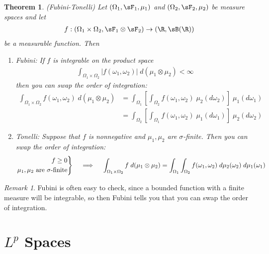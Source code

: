 \documentclass[12pt]{article}
\theoremstyle{plain}
\newtheorem{thm}{Theorem}[section]
\theoremstyle{definition}
\theoremstyle{remark}
\newtheorem*{rmk}{Remark}
\newcommand{\ra}{\rightarrow}
\newenvironment{rcases}
  {\left.\begin{aligned}}
  {\end{aligned}\right\rbrace}
\begin{document}
\begin{thm}\emph{(Fubini-Tonelli)}
Let
$(\Omega_1,\sF_1,\mu_1)$ and
$(\Omega_2,\sF_2,\mu_2)$
be measure spaces and let
\begin{align*}
  f:
  (\Omega_1\times \Omega_2, \sF_1\otimes\sF_2)
  \ra
  (\R,\sB(\R))
\end{align*}
be a measurable function. Then
\begin{enumerate}
  \item \emph{Fubini}:
    If $f$ is integrable on the product space
    \begin{align*}
      \int_{\Omega_1\times \Omega_2}
      |f(\omega_1,\omega_2)| \; d(\mu_1\otimes\mu_2)
      <\infty
    \end{align*}
    then you can swap the order of integration:
    \begin{align*}
      \int_{\Omega_1\times \Omega_2}
      f(\omega_1,\omega_2) \; d(\mu_1\otimes\mu_2)
      &=
      \int_{\Omega_1} \left[\int_{\Omega_2}
      f(\omega_1,\omega_2)
      \;\mu_2(d\omega_2) \right]\;\mu_1(d\omega_1) \\
      &=
      \int_{\Omega_2}\left[
        \int_{\Omega_1}
      f(\omega_1,\omega_2)
      \;\mu_1(d\omega_1) \right]\;\mu_2(d\omega_2)
    \end{align*}

  \item \emph{Tonelli}:
    Suppose that $f$ is nonnegative and $\mu_1,\mu_2$ are
    $\sigma$-finite. Then you can swap the order of integration:
    \begin{align*}
      \begin{rcases}
      f\geq 0 \\
      \text{$\mu_1,\mu_2$ are $\sigma$-finite}
      \end{rcases}
      \quad\implies \quad
      \int_{\Omega_1\times \Omega_2}
      f \; d(\mu_1\otimes\mu_2)
      =
      \int_{\Omega_1}\int_{\Omega_2}
      f(\omega_1,\omega_2)
      \;d\mu_2(\omega_2) \;d\mu_1(\omega_1)
    \end{align*}
\end{enumerate}
\end{thm}
\begin{rmk}
Fubini is often easy to check, since a bounded function with a finite
measure will be integrable, so then Fubini tells you that you can swap
the order of integration.
\end{rmk}



\clearpage
\section{$L^p$ Spaces}
\end{document}
